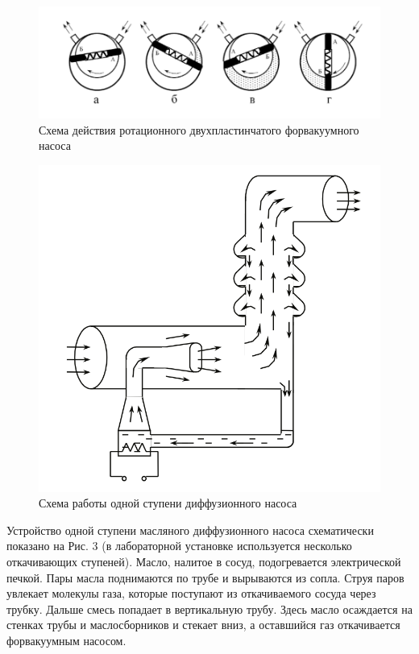 \documentclass[a4paper, 12pt]{article}
\begin{document}
\begin{figure}[H]
	\centering
	\includegraphics[width=0.9\linewidth]{2.jpg}
	\caption[]{Схема действия ротационного двухпластинчатого форвакуумного насоса}
	\label{fig:Схема ФВ насоса}
\end{figure}

\begin{figure}[H] 
	\centering 
	\includegraphics[scale=0.2]{3.jpg} 
	\caption{Схема работы одной ступени диффузионного насоса} 
\end{figure}

Устройство одной ступени масляного диффузионного насоса схематически показано на Рис. 3 (в лабораторной установке используется несколько откачивающих ступеней). Масло, налитое в сосуд, подогревается электрической печкой. Пары масла поднимаются по трубе и вырываются из сопла. Струя паров увлекает молекулы газа, которые поступают из откачиваемого сосуда через трубку. Дальше смесь попадает в вертикальную трубу. Здесь масло осаждается на стенках трубы и маслосборников и стекает вниз, а оставшийся газ откачивается форвакуумным насосом. 
\end{document}
